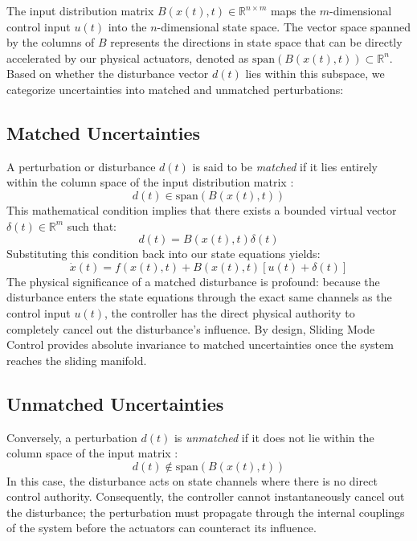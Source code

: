 The input distribution matrix $B(x(t), t) \in \mathbb{R}^{n \times m}$ maps the $m$-dimensional control input $u(t)$ into the $n$-dimensional state space. The vector space spanned by the columns of $B$ represents the directions in state space that can be directly accelerated by our physical actuators, denoted as $\text{span}(B(x(t), t)) \subset \mathbb{R}^n$. Based on whether the disturbance vector $d(t)$ lies within this subspace, we categorize uncertainties into matched and unmatched perturbations:

\subsection{Matched Uncertainties}
A perturbation or disturbance $d(t)$ is said to be \textit{matched} if it lies entirely within the column space of the input distribution matrix \cite{ref_72}:
\begin{equation}
d(t) \in \text{span}(B(x(t), t))
\end{equation}
This mathematical condition implies that there exists a bounded virtual vector $\delta(t) \in \mathbb{R}^m$ such that:
\begin{equation}
d(t) = B(x(t), t)\delta(t)
\end{equation}
Substituting this condition back into our state equations yields:
\begin{equation}
\dot{x}(t) = f(x(t), t) + B(x(t), t) [u(t) + \delta(t)]
\end{equation}
The physical significance of a matched disturbance is profound: because the disturbance enters the state equations through the exact same channels as the control input $u(t)$, the controller has the direct physical authority to completely cancel out the disturbance's influence. By design, Sliding Mode Control provides absolute invariance to matched uncertainties once the system reaches the sliding manifold.

\subsection{Unmatched Uncertainties}
Conversely, a perturbation $d(t)$ is \textit{unmatched} if it does not lie within the column space of the input matrix \cite{ref_72}:
\begin{equation}
d(t) \notin \text{span}(B(x(t), t))
\end{equation}
In this case, the disturbance acts on state channels where there is no direct control authority. Consequently, the controller cannot instantaneously cancel out the disturbance; the perturbation must propagate through the internal couplings of the system before the actuators can counteract its influence.

